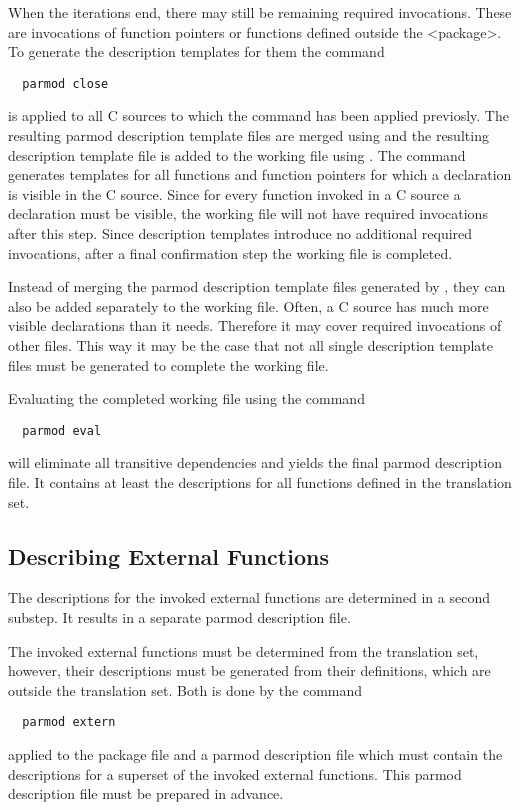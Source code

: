 When the iterations end, there may still be remaining required invocations. These are invocations of function
pointers or functions defined outside the <package>. To generate the description templates for them the command
\begin{verbatim}
  parmod close
\end{verbatim}
is applied to all C sources to which the command  has been applied previosly. The resulting 
parmod description template files are merged using  and the resulting description template file
is added to the working file using . The command  generates templates for
all functions and function pointers for which a declaration is visible in the C source. Since for every function
invoked in a C source a declaration must be visible, the working file will not have required invocations after
this step. Since description templates introduce no additional required invocations, after a final confirmation
step the working file is completed.

Instead of merging the parmod description template files generated by , they can also be added
separately to the working file. Often, a C source has much more visible declarations than it needs. Therefore it may
cover required invocations of other files. This way it may be the case that not all single description template
files must be generated to complete the working file.

Evaluating the completed working file using the command
\begin{verbatim}
  parmod eval
\end{verbatim}
will eliminate all transitive dependencies and yields the final parmod description file. It contains at least 
the descriptions for all functions defined in the translation set.

\subsection{Describing External Functions}
\label{app-parmod-extern}

The descriptions for the invoked external functions are determined in a second substep. It results in 
a separate parmod description file. 

The invoked external functions must be determined from the translation set, however, their descriptions must
be generated from their definitions, which are outside the translation set. Both is done by the command
\begin{verbatim}
  parmod extern
\end{verbatim}
applied to the package file and a parmod description file which must contain the descriptions for a superset
of the invoked external functions. This parmod description file must be prepared in advance.

